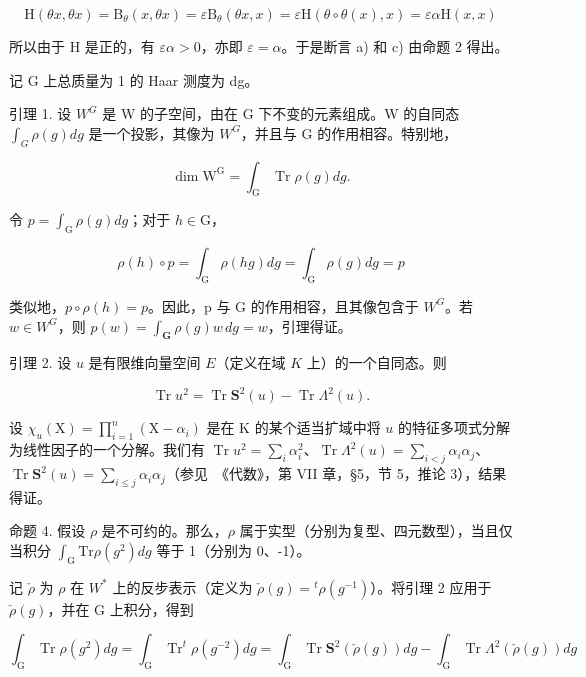 \[
\mathrm{H} (\theta x, \theta x) = \mathrm{B} _ {\theta} (x, \theta x) = \varepsilon \mathrm{B} _ {\theta} (\theta x, x) = \varepsilon \mathrm{H} (\theta \circ \theta (x), x) = \varepsilon \alpha \mathrm{H} (x, x)
\]

所以由于 H 是正的，有 \(\varepsilon\alpha > 0\)，亦即 \(\varepsilon = \alpha\)。于是断言 a) 和 c) 由命题 2 得出。

记 G 上总质量为 1 的 Haar 测度为 dg。

引理 1. 设 \(W^{G}\) 是 W 的子空间，由在 G 下不变的元素组成。W 的自同态 \(\int_{G}\rho(g)dg\) 是一个投影，其像为 \(W^{G}\)，并且与 G 的作用相容。特别地，

\[
\dim \mathrm{W} ^ {\mathrm{G}} = \int_ {\mathrm{G}} \operatorname{Tr} \rho (g) d g.
\]

令 \(p = \int_{\mathrm{G}} \rho(g) dg\)；对于 \(h \in \mathrm{G}\)，

\[
\rho (h) \circ p = \int_ {\mathrm{G}} \rho (h g) d g = \int_ {\mathrm{G}} \rho (g) d g = p
\]

类似地，\(p \circ \rho(h) = p\)。因此，p 与 G 的作用相容，且其像包含于 \(W^{G}\)。若 \(w \in W^{G}\)，则 \(p(w) = \int_{\mathbf{G}} \rho(g) w \, dg = w\)，引理得证。

引理 2. 设 \(u\) 是有限维向量空间 \(E\)（定义在域 \(K\) 上）的一个自同态。则

\[
\operatorname{Tr} u ^ {2} = \operatorname{Tr} \mathbf {S} ^ {2} (u) - \operatorname{Tr} \Lambda^ {2} (u).
\]

设 \(\chi_u(\mathrm{X}) = \prod_{i=1}^{n} (\mathrm{X} - \alpha_i)\) 是在 K 的某个适当扩域中将 \(u\) 的特征多项式分解为线性因子的一个分解。我们有 \(\operatorname{Tr} u^2 = \sum_i \alpha_i^2\)、\(\operatorname{Tr} \Lambda^2(u) = \sum_{i < j} \alpha_i \alpha_j\)、\(\operatorname{Tr} \mathbf{S}^2(u) = \sum_{i \leq j} \alpha_i \alpha_j\)（参见~《代数》，第 VII 章，§5，节 5，推论 3），结果得证。

命题 4. 假设 \(\rho\) 是不可约的。那么，\(\rho\) 属于实型（分别为复型、四元数型），当且仅当积分 \(\int_{\mathrm{G}} \mathrm{Tr} \rho(g^2) dg\) 等于 1（分别为 0、-1）。

记 \(\check{\rho}\) 为 \(\rho\) 在 \(W^{*}\) 上的反步表示（定义为 \(\check{\rho}(g)={}^{t}\rho(g^{-1})\)）。将引理 2 应用于 \(\check{\rho}(g)\)，并在 G 上积分，得到

\[
\int_ {\mathrm{G}} \operatorname{Tr} \rho (g ^ {2}) d g = \int_ {\mathrm{G}} \operatorname{Tr} ^ {t} \rho (g ^ {- 2}) d g = \int_ {\mathrm{G}} \operatorname{Tr} \mathbf {S} ^ {2} (\check {\rho} (g)) d g - \int_ {\mathrm{G}} \operatorname{Tr} \Lambda^ {2} (\check {\rho} (g)) d g
\]


